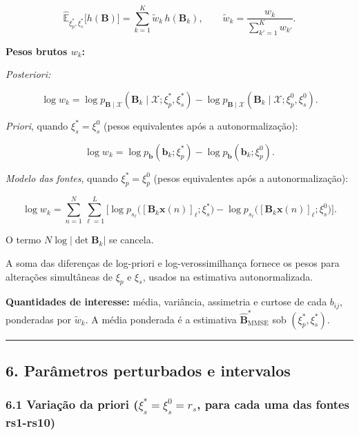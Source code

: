 \documentclass[11pt]{article}
\begin{document}
\[\widehat{\mathbb{E}}_{\xi_p^{\ast},\xi_s^{\ast}}\big[h(\mathbf{B})\big]
= \sum_{k=1}^{K} \tilde{w}_k\, h(\mathbf{B}_k),
\qquad
\tilde{w}_k = \frac{w_k}{\sum_{k'=1}^{K} w_{k'}}.\]

\textbf{Pesos brutos \(w_k\):}

\emph{Posteriori:}

\[\log w_k
= \log p_{\mathbf{B}\mid\mathcal{X}}(\mathbf{B}_k\mid\mathcal{X};\xi_p^{\ast},\xi_s^{\ast})
- \log p_{\mathbf{B}\mid\mathcal{X}}(\mathbf{B}_k\mid\mathcal{X};\xi_p^{0},\xi_s^{0}).\]

\emph{Priori}, quando \(\xi_s^{\ast}=\xi_s^{0}\) (pesos equivalentes
após a autonormalização):

\[\log w_k = \log p_{\mathbf{b}}(\mathbf{b}_k;\xi_p^{\ast}) - \log p_{\mathbf{b}}(\mathbf{b}_k;\xi_p^{0}).\]

\emph{Modelo das fontes}, quando \(\xi_p^{\ast}=\xi_p^{0}\) (pesos
equivalentes após a autonormalização):

\[\log w_k
= \sum_{n=1}^{N}\sum_{\ell=1}^{L}
\Big[
\log p_{s_\ell}\big([\mathbf{B}_k\mathbf{x}(n)]_\ell;\xi_s^{\ast}\big)
- \log p_{s_\ell}\big([\mathbf{B}_k\mathbf{x}(n)]_\ell;\xi_s^{0}\big)
\Big].\]

O termo \(N\log|\det\mathbf{B}_k|\) se cancela.

A soma das diferenças de log-priori e log-verossimilhança fornece os
pesos para alterações simultâneas de \(\xi_p\) e \(\xi_s\), usados na
estimativa autonormalizada.

\textbf{Quantidades de interesse:} média, variância, assimetria e
curtose de cada \(b_{ij}\), ponderadas por \(\tilde{w}_k\). A média
ponderada é a estimativa \(\widehat{\mathbf{B}}_{\mathrm{MMSE}}^{\ast}\)
sob \((\xi_p^{\ast},\xi_s^{\ast})\).

\begin{center}\rule{0.5\linewidth}{0.5pt}\end{center}

\subsection{6. Parâmetros perturbados e
intervalos}\label{paruxe2metros-perturbados-e-intervalos}

\subsubsection{\texorpdfstring{6.1 Variação da priori
(\(\xi_s^{*} = \xi_s^{0}=r_{s}\), para cada uma das fontes
rs1-rs10)}{6.1 Variação da priori (\textbackslash xi\_s\^{}\{*\} = \textbackslash xi\_s\^{}\{0\}=r\_\{s\}, para cada uma das fontes rs1-rs10)}}\label{variauxe7uxe3o-da-priori-xi_s-xi_s0r_s-para-cada-uma-das-fontes-rs1-rs10}
\end{document}
